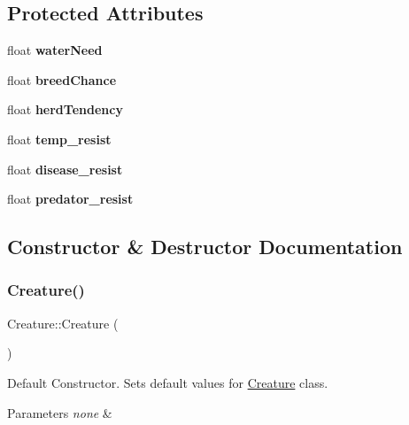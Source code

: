 \subsection*{Protected Attributes}
\begin{DoxyCompactItemize}
\item 
\mbox{\label{class_creature_a4240e372407b7df5614b0766f95524a8}} 
float {\bfseries water\+Need}
\item 
\mbox{\label{class_creature_a66cb1f9c65d6b63976b00e03c9174868}} 
float {\bfseries breed\+Chance}
\item 
\mbox{\label{class_creature_aeac241536d909e12cbae19d1577a8cbe}} 
float {\bfseries herd\+Tendency}
\item 
\mbox{\label{class_creature_a53c8032f68153df41f7b22796eb72bd0}} 
float {\bfseries temp\+\_\+resist}
\item 
\mbox{\label{class_creature_a797fc79828501798cd216f56471583fc}} 
float {\bfseries disease\+\_\+resist}
\item 
\mbox{\label{class_creature_a85bd79783c5a8f9b0de2c7be338d0eca}} 
float {\bfseries predator\+\_\+resist}
\end{DoxyCompactItemize}


\subsection{Constructor \& Destructor Documentation}
\mbox{\label{class_creature_a597cc3b08ee17de46c3e7ec3cf0d9b58}} 
\subsubsection{\texorpdfstring{Creature()}{Creature()}}
{\footnotesize\ttfamily Creature\+::\+Creature (\begin{DoxyParamCaption}{ }\end{DoxyParamCaption})}

Default Constructor. Sets default values for \hyperlink{class_creature}{Creature} class. 
\begin{DoxyParams}{Parameters}
{\em none} & \\
\hline
\end{DoxyParams}
\mbox{\label{class_creature_aa991b23f4813fbdb6f875204ed49814d}} 
